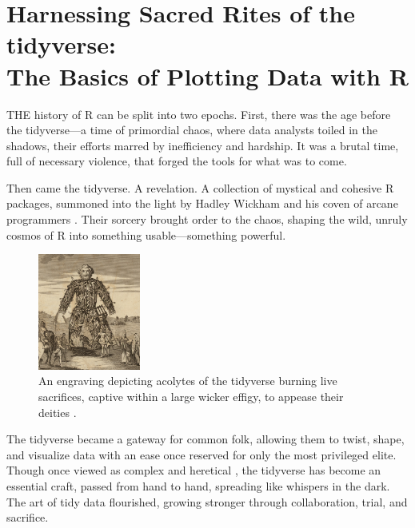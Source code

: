 \chapter[Harnessing Sacred Rites of the tidyverse: Plotting Basics]{Harnessing Sacred Rites of the tidyverse:\\ \huge The Basics of Plotting Data with R}

\IMFellEnglish
\lettrine[lines=5, realheight, lraise = 0.045]{T}{HE} history of R can be split into two epochs. First, there was the age before the tidyverse—a time of primordial chaos, where data analysts toiled in the shadows, their efforts marred by inefficiency and hardship. It was a brutal time, full of necessary violence, that forged the tools for what was to come.

Then came the tidyverse. A revelation. A collection of mystical and cohesive R packages, summoned into the light by Hadley Wickham and his coven of arcane programmers \parencite{Wickham2019}. Their sorcery brought order to the chaos, shaping the wild, unruly cosmos of R into something usable—something powerful.

\begin{figure}
  \begin{center}
    \includegraphics[width=0.3\textwidth]{graphics/ch2Figs/t_pennant.pdf}
  \end{center}
    \caption{An engraving depicting acolytes of the tidyverse burning live sacrifices, captive within a large wicker effigy, to appease their deities \parencite{Pennant1784}.}
    \label{fig:ch2_wicker}
\end{figure}

The tidyverse became a gateway for common folk, allowing them to twist, shape, and visualize data with an ease once reserved for only the most privileged elite. Though once viewed as complex and heretical \parencite{Muenchen}, the tidyverse has become an essential craft, passed from hand to hand, spreading like whispers in the dark. The art of tidy data flourished, growing stronger through collaboration, trial, and sacrifice.


